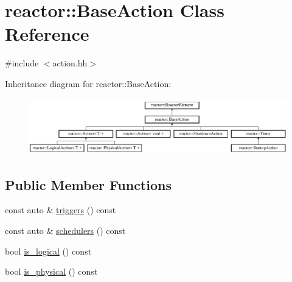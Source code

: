 \hypertarget{classreactor_1_1BaseAction}{}\section{reactor\+:\+:Base\+Action Class Reference}
\label{classreactor_1_1BaseAction}


{\ttfamily \#include $<$action.\+hh$>$}

Inheritance diagram for reactor\+:\+:Base\+Action\+:\begin{figure}[H]
\begin{center}
\leavevmode
\includegraphics[height=2.461539cm]{classreactor_1_1BaseAction}
\end{center}
\end{figure}
\subsection*{Public Member Functions}
\begin{DoxyCompactItemize}
\item 
const auto \& \hyperlink{classreactor_1_1BaseAction_a330820b1a4bbe1b18d5b30773a690818}{triggers} () const
\item 
const auto \& \hyperlink{classreactor_1_1BaseAction_ac480015d4e2e2309fa7f9b2e2a7a59ab}{schedulers} () const
\item 
bool \hyperlink{classreactor_1_1BaseAction_abff8e7a40679e9f0d6d31eb795530279}{is\+\_\+logical} () const
\item 
bool \hyperlink{classreactor_1_1BaseAction_ae088220a837f00686793dd0a50629dc0}{is\+\_\+physical} () const
\end{DoxyCompactItemize}
